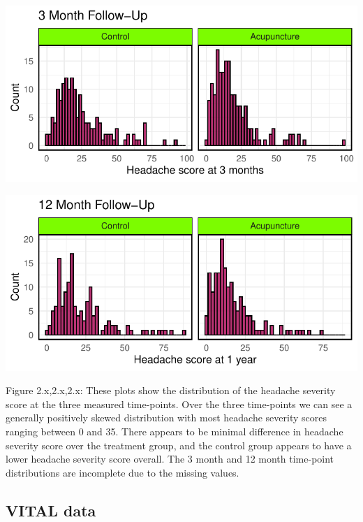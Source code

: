 \documentclass{article}
\newcommand{\pandocbounded}[1]{#1}
\begin{document}
\pandocbounded{\includegraphics[keepaspectratio]{Final_Report_files/figure-latex/unnamed-chunk-12-1.pdf}}

\pandocbounded{\includegraphics[keepaspectratio]{Final_Report_files/figure-latex/unnamed-chunk-13-1.pdf}}

Figure 2.x,2.x,2.x: These plots show the distribution of the headache
severity score at the three measured time-points. Over the three
time-points we can see a generally positively skewed distribution with
most headache severity scores ranging between 0 and 35. There appears to
be minimal difference in headache severity score over the treatment
group, and the control group appears to have a lower headache severity
score overall. The 3 month and 12 month time-point distributions are
incomplete due to the missing values.

\subsection{VITAL data}\label{vital-data}
\end{document}

